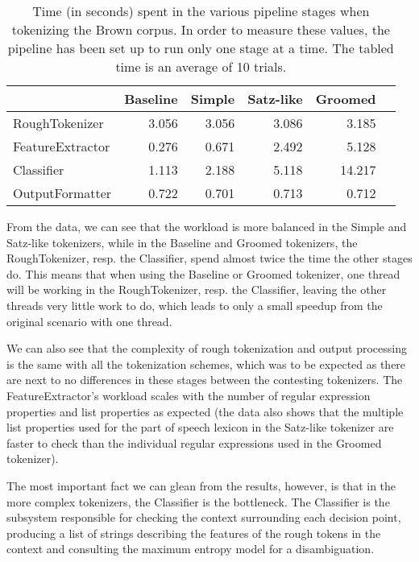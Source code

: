 \begin{table}
  \begin{center}
    \begin{tabular}{ | l | r | r | r | r | r | }
      \hline
      & Baseline & Simple & Satz-like & Groomed \\ \hline
      RoughTokenizer & 3.056 & 3.056 & 3.086 & 3.185 \\ \hline
      FeatureExtractor & 0.276 & 0.671 & 2.492 & 5.128 \\ \hline
      Classifier & 1.113 & 2.188 & 5.118 & 14.217 \\ \hline
      OutputFormatter & 0.722 & 0.701 & 0.713 & 0.712 \\
      \hline
    \end{tabular}
  \end{center}
  \caption[Time spent in individual pipeline elements]
    {Time (in seconds) spent in the various pipeline stages when tokenizing the
    Brown corpus. In order to measure these values, the pipeline has been set
    up to run only one stage at a time. The tabled time is an average of 10
    trials.}
  \label{tbl:bottlenecks}
\end{table}

From the data, we can see that the workload is more balanced in the Simple and
Satz-like tokenizers, while in the Baseline and Groomed tokenizers, the
RoughTokenizer, resp. the Classifier, spend almost twice the time the other
stages do. This means that when using the Baseline or Groomed tokenizer, one
thread will be working in the RoughTokenizer, resp. the Classifier, leaving the
other threads very little work to do, which leads to only a small speedup from
the original scenario with one thread.

We can also see that the complexity of rough tokenization and output processing
is the same with all the tokenization schemes, which was to be expected as
there are next to no differences in these stages between the contesting
tokenizers. The FeatureExtractor's workload scales with the number of regular
expression properties and list properties as expected (the data also shows that
the multiple list properties used for the part of speech lexicon in the
Satz-like tokenizer are faster to check than the individual regular expressions
used in the Groomed tokenizer).

The most important fact we can glean from the results, however, is that in the
more complex tokenizers, the Classifier is the bottleneck. The Classifier is
the subsystem responsible for checking the context surrounding each decision
point, producing a list of strings describing the features of the rough tokens
in the context and consulting the maximum entropy model for a disambiguation.

